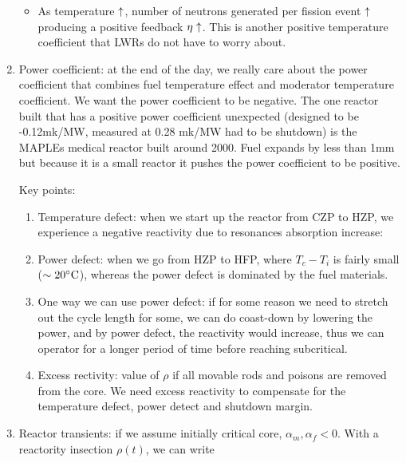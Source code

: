 \documentclass{school-22.211-notes}
\begin{document}
\begin{enumerate}
\begin{itemize}
\item As temperature $\uparrow$, number of neutrons generated per fission event $\uparrow$ producing a positive feedback $\eta \uparrow$. This is another positive temperature coefficient that LWRs do not have to worry about. 
\end{itemize}


\item Power coefficient: at the end of the day, we really care about the power coefficient that combines fuel temperature effect and moderator temperature coefficient. We want the power coefficient to be negative. 
The one reactor built that has a positive power coefficient unexpected (designed to be -0.12mk/MW, measured at 0.28 mk/MW had to be shutdown) is the MAPLEs medical reactor built around 2000. 
Fuel expands by less than 1mm but because it is a small reactor it pushes the power coefficient to be positive. 

Key points:
\begin{enumerate}
\item Temperature defect: when we start up the reactor from CZP to HZP, we experience a negative reactivity due to resonances absorption increase: 

\item Power defect: when we go from HZP to HFP, 
  where $T_c - T_i$ is fairly small ($\sim 20^\circ\mathrm{C}$), whereas the power defect is dominated by the fuel materials. 

\item One way we can use power defect: if for some reason we need to stretch out the cycle length for some, we can do coast-down by lowering the power, and by power defect, the reactivity would increase, thus we can operator for a longer period of time before reaching subcritical. 

\item Excess rectivity: value of $\rho$ if all movable rods and poisons are removed from the core. We need excess reactivity to compensate for the temperature defect, power detect and shutdown margin. 
\end{enumerate}

\item Reactor transients: if we assume initially critical core, $\alpha_m, \alpha_f < 0$. With a reactority insection $\rho(t)$, we can write 
\end{enumerate}
\end{document}
